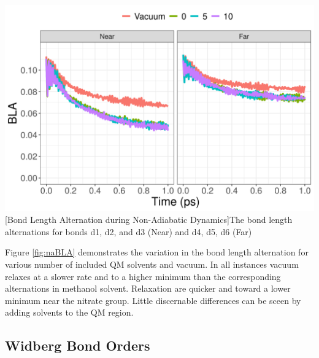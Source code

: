 \noindent
\begin{minipage}[c]{\textwidth}
  \centering
  \includegraphics[width=\textwidth]{../Paper2/Images/bla/solvent_comparison.png}
  [Bond Length Alternation during Non-Adiabatic Dynamics]{The bond length alternations for bonds d1, d2, and d3 (Near) and d4, d5, d6 (Far)}
  \label{fig:naBLA}
\end{minipage}\bigskip

Figure \ref{fig:naBLA} demonstrates the variation in the bond length alternation for various number of included QM solvents and vacuum.
In all instances vacuum relaxes at a slower rate and to a higher minimum than the corresponding alternations in methanol solvent.
Relaxation are quicker and toward a lower minimum near the nitrate group.
Little discernable differences can be sceen by adding solvents to the QM region.

\subsection{Widberg Bond Orders}

